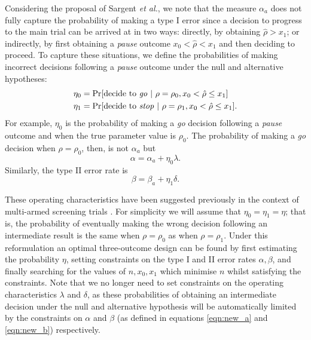 \documentclass[referee, lineno, pdflatex,sn-vancouver,Numbered]{sn-jnl}%
\theoremstyle{thmstyleone}%
\theoremstyle{thmstyletwo}%
\theoremstyle{thmstylethree}%
\begin{document}
Considering the proposal of Sargent \emph{et al.}, we note that the measure $\alpha_a$ does not fully capture the probability of making a type I error %
since a decision to progress to the main trial can be arrived at in two ways: directly, by obtaining $\hat{\rho} > x_1$; or indirectly, by first obtaining a \emph{pause} outcome $x_0 < \hat{\rho} < x_1$ and then deciding to proceed. To capture these situations, we define the probabilities of making incorrect decisions following a \emph{pause} outcome under the null and alternative hypotheses:
\begin{align}
\eta_0 &= \Pr[\text{decide to \emph{go}} ~|~ \rho = \rho_0, x_0 < \hat{\rho} \leq x_1] \\
\eta_1 &= \Pr[\text{decide to \emph{stop}} ~|~ \rho = \rho_1, x_0 < \hat{\rho} \leq x_1].
\end{align}
For example, $\eta_0$ is the probability of making a \emph{go} decision following a \emph{pause} outcome and when the true parameter value is $\rho_0$. The probability of making a \emph{go} decision when $\rho = \rho_0$, then, is not $\alpha_a$ but
\begin{equation}\label{eqn:new_a}
\alpha = \alpha_a + \eta_0 \lambda.
\end{equation}
Similarly, the type II error rate is
\begin{equation}\label{eqn:new_b}
\beta = \beta_a + \eta_1 \delta.
\end{equation}

These operating characteristics have been suggested previously in the context of multi-armed screening trials \cite{Sargent2001a, Dehbi2020}. For simplicity we will assume that $\eta_0 = \eta_1 = \eta$; that is, the probability of eventually making the wrong decision following an intermediate result is the same when $\rho = \rho_0$ as when $\rho = \rho_1$. Under this reformulation an optimal three-outcome design can be found by first estimating the probability $\eta$, setting constraints on the type I and II error rates $\alpha, \beta$, and finally searching for the values of  $n, x_0, x_1$ which minimise $n$ whilst satisfying the constraints. Note that we no longer need to set constraints on the operating characteristics $\lambda$ and $\delta$, as these probabilities of obtaining an intermediate decision under the null and alternative hypothesis will be automatically limited by the constraints on $\alpha$ and $\beta$ (as defined in equations \ref{eqn:new_a} and \ref{eqn:new_b}) respectively.
\end{document}
